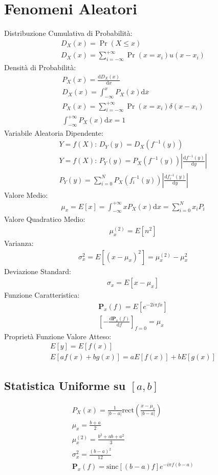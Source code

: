 \documentclass{article}
\newcommand{\rect}{\mathrm{rect}}
\newcommand{\sinc}{\mathrm{sinc}}
\newcommand{\df}{\mathrm{d}}
\newcommand{\intinf}{\displaystyle\int_{-\infty}^{+\infty}}
\newcommand{\suminfi}{\displaystyle\sum_{i=-\infty}^{+\infty}}
\begin{document}
\section{Fenomeni Aleatori}
Distribuzione Cumulativa di Probabilità:
\begin{gather*}
    D_X(x)=\Pr(X\leq x)\\
    D_X(x)=\suminfi \Pr(x=x_i)u(x-x_i)
\end{gather*}
Densità di Probabilità:
\begin{gather*}
    P_X(x)=\displaystyle\frac{\df D_X(x)}{\df x}\\
    D_X(x)=\displaystyle\int_{-\infty}^xP_X(\overline{x})\df\overline{x}\\
    P_X(x)=\suminfi \Pr(x=x_i)\delta(x-x_i)\\
    \intinf P_X(x)\df x=1
\end{gather*}
Variabile Aleatoria Dipendente:
\begin{gather*}
    Y=f(X):\,D_Y(y)=D_X(f^{-1}(y))\\
    Y=f(X):\,P_Y(y)=P_X(f^{-1}(y))\left|\displaystyle\frac{\df f^{-1}(y)}{\df y}\right|\\
    P_Y(y)=\displaystyle\sum_{i=0}^NP_X(f_i^{-1}(y))\left|\frac{\df f_i^{-1}(y)}{\df y}\right|
\end{gather*}
Valore Medio:
\begin{gather*}
    \mu_x=E[x]=\intinf xP_X(x)\df x=\sum_{i=0}^Nx_iP_i
\end{gather*}
Valore Quadratico Medio:
\begin{gather*}
    \mu_x^{(2)}=E[n^2]
\end{gather*}
Varianza:
\begin{gather*}
    \sigma_x^2=E[(x-\mu_x)^2]=\mu_x^{(2)}-\mu_x^2
\end{gather*}
Deviazione Standard:
\begin{gather*}
    \sigma_x=E[x-\mu_x]
\end{gather*}
Funzione Caratteristica:
\begin{gather*}
    \mathbf{P}_x(f)=E[e^{-2i\pi fx}]\\
    \left[-\displaystyle\frac{\df\mathbf{P}_x(f)}{\df f}\right]_{f=0}=\mu_x
\end{gather*}
Proprietà Funzione Valore Atteso:
\begin{gather*}
    E[y]=E[f(x)]\\
    E[af(x)+bg(x)]=aE[f(x)]+bE[g(x)]
\end{gather*}
\subsection*{Statistica Uniforme su $[a,b]$}
\begin{gather*}
    P_X(x)=\displaystyle\frac{1}{|b-a|}\rect\left(\frac{x-\mu_x}{|b-a|}\right)\\ 
    \mu_x=\displaystyle\frac{b+a}{2}\\
    \mu_x^{(2)}=\displaystyle\frac{b^2+ab+a^2}{3}\\
    \sigma_x^2=\displaystyle\frac{(b-a)^2}{12}\\
    \mathbf{P}_x(f)=\sinc[(b-a)f]e^{-i\pi f(b-a)}
\end{gather*}
\end{document}

